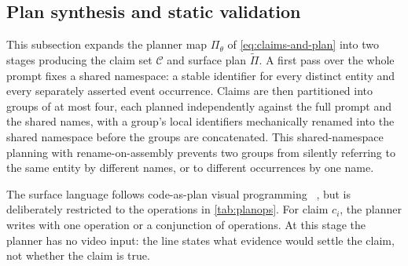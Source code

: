 \subsection{Plan synthesis and static validation}
\label{sec:plan-construction}
This subsection expands the planner map $\Pi_\theta$ of \cref{eq:claims-and-plan} into two stages producing the claim set $\mathcal{C}$ and surface plan $\widetilde{\Pi}$. A first pass over the whole prompt fixes a shared namespace: a stable identifier for every distinct entity and every separately asserted event occurrence. Claims are then partitioned into groups of at most four, each planned independently against the full prompt and the shared names, with a group's local identifiers mechanically renamed into the shared namespace before the groups are concatenated. This shared-namespace planning with rename-on-assembly prevents two groups from silently referring to the same entity by different names, or to different occurrences by one name.

The surface language follows code-as-plan visual programming
~\cite{vipergpt2023,visprog2023}, but is deliberately restricted to the
operations in \cref{tab:planops}. For claim $c_i$, the planner writes
 with one operation or a conjunction of operations. At
this stage the planner has no video input: the line states what evidence would
settle the claim, not whether the claim is true.

